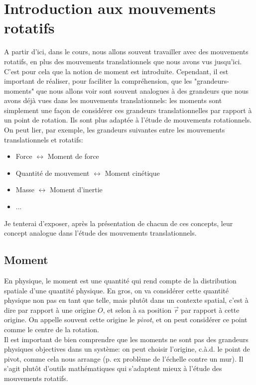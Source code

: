 \documentclass{article}
\numberwithin{equation}{section}
\begin{document}
\section{Introduction aux mouvements rotatifs}
A partir d'ici, dans le cours, nous allons souvent travailler avec des mouvements rotatifs, en plus des mouvements translationnels que nous avons vus jusqu'ici. C'est pour cela que la notion de moment est introduite. Cependant, il est important de réaliser, pour faciliter la compréhension, que les "grandeurs-moments" que nous allons voir sont souvent analogues à des grandeurs que nous avons déjà vues dans les mouvements translationnels: les moments sont simplement une façon de considérer ces grandeurs translationnelles par rapport à un point de rotation. Ils sont plus adaptée à l'étude de mouvements rotationnels. \\

On peut lier, par exemple, les grandeurs suivantes entre les mouvements translationnels et rotatifs:
\begin{itemize}
	\item Force \(\leftrightarrow\) Moment de force
	\item Quantité de mouvement \(\leftrightarrow\) Moment cinétique
	\item Masse \(\leftrightarrow\) Moment d'inertie
	\item ...
\end{itemize}
Je tenterai d'exposer, après la présentation de chacun de ces concepts, leur concept analogue dans l'étude des mouvements translationnels.

\subsection{Moment}
En physique, le moment est une quantité qui rend compte de la distribution spatiale d'une quantité physique. En gros, on va considérer cette quantité physique non pas en tant que telle, mais plutôt dans un contexte spatial, c'est à dire par rapport à une origine \(O\), et selon à sa position \(\vec r\) par rapport à cette origine. On appelle souvent cette origine le \emph{pivot}, et on peut considérer ce point comme le centre de la rotation. \\ Il est important de bien comprendre que les moments ne sont pas des grandeurs physiques objectives dans un système: on peut choisir l'origine, c.à.d. le point de pivot, comme cela nous arrange (p. ex problème de l'échelle contre un mur). Il s'agit plutôt d'outils mathématiques qui s'adaptent mieux à l'étude des mouvements rotatifs. \\
\end{document}
